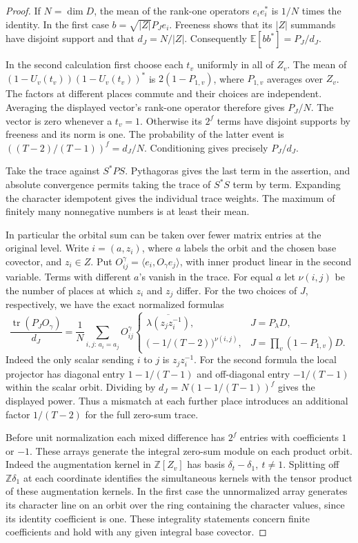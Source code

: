 \documentclass[a4paper,11pt]{article}
\theoremstyle{definition}
\theoremstyle{remark}
\newcommand{\ZZ}{\mathbb Z}\newcommand{\ord}{\operatorname{ord}}
\numberwithin{equation}{section}
\begin{document}
\begin{proof}
If \(N=\dim D\), the mean of the rank-one operators \(e_ie_i^*\)
is \(1/N\) times the identity. In the first case \(b=\sqrt{|Z|}
P_J e_i\). Freeness shows that its \(|Z|\) summands have disjoint
support and that \(d_J=N/|Z|\). Consequently
\(\mathbb E[bb^*]=P_J/d_J\).

In the second calculation first choose each \(t_v\) uniformly
in all of \(Z_v\). The mean of
\((1-U_v(t_v))(1-U_v(t_v))^*\) is \(2(1-P_{1,v})\), where
\(P_{1,v}\) averages over \(Z_v\). The factors at different
places commute and their choices are independent. Averaging the
displayed vector's rank-one operator therefore gives \(P_J/N\).
The vector is zero whenever a \(t_v=1\). Otherwise its \(2^f\)
terms have disjoint supports by freeness and its norm is one.
The probability of the latter event is
\(((T-2)/(T-1))^f=d_J/N\). Conditioning gives precisely \(P_J/d_J\).

Take the trace against \(S^*PS\). Pythagoras gives the last
term in the assertion, and absolute convergence permits taking
the trace of \(S^*S\) term by term. Expanding the character
idempotent gives the individual trace weights. The maximum of
finitely many nonnegative numbers is at least their mean.

In particular the orbital sum can be taken over fewer matrix
entries at the original level. Write \(i=(a,z_i)\), where \(a\)
labels the orbit and the chosen base covector, and \(z_i\in Z\).
Put \(O^\gamma_{ij}=\langle e_i,O_\gamma e_j\rangle\), with
inner product linear in the second variable. Terms with different
\(a\)'s vanish in the trace. For equal \(a\) let \(\nu(i,j)\)
be the number of places at which \(z_i\) and \(z_j\) differ.
For the two choices of \(J\), respectively, we have the exact
normalized formulas
\[
 \frac{\operatorname{tr}(P_JO_\gamma)}{d_J}
 =\frac1N\sum_{i,j:\,a_i=a_j} O^\gamma_{ij}
 \begin{cases}
    \overline{\lambda(z_jz_i^{-1})}, & J=P_\lambda D,\\
    \bigl(-1/(T-2)\bigr)^{\nu(i,j)}, & J=\prod_v(1-P_{1,v})D .
 \end{cases}
\]
Indeed the only scalar sending \(i\) to \(j\) is \(z_jz_i^{-1}\).
For the second formula the local projector has diagonal entry
\(1-1/(T-1)\) and off-diagonal entry \(-1/(T-1)\) within the
scalar orbit. Dividing by \(d_J=N(1-1/(T-1))^f\) gives the
displayed power. Thus a mismatch at each further place introduces
an additional factor \(1/(T-2)\) for the full zero-sum trace.

Before unit normalization each mixed difference has \(2^f\) entries
with coefficients \(1\) or \(-1\). These arrays generate the
integral zero-sum module on each product orbit. Indeed the
augmentation kernel in \(\ZZ[Z_v]\) has basis
\(\delta_t-\delta_1,\ t\ne1\). Splitting off \(\ZZ\delta_1\)
at each coordinate identifies the simultaneous kernels with the
tensor product of these augmentation kernels. In the first case
the unnormalized array generates its character line on an orbit
over the ring containing the character values, since its identity
coefficient is one. These integrality statements concern finite
coefficients and hold with any given integral base covector.
\end{proof}
\end{document}
